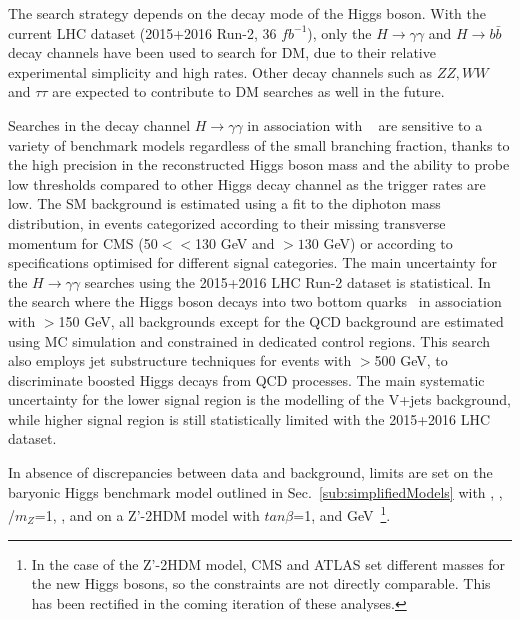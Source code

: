 The search strategy depends on the decay mode of the Higgs boson. 
With the current LHC dataset (2015+2016 Run-2, 36 $fb^{-1}$), only the 
$H \rightarrow \gamma\gamma$ and $H \rightarrow b\bar{b}$ decay channels 
have been used to search for DM, due to their relative experimental simplicity
and high rates. Other decay channels such as $ZZ, WW$ and $\tau\tau$ are 
expected to contribute to DM searches as well in the future. 

Searches in the decay channel 
$H \rightarrow \gamma\gamma$ in association with \MET~\cite{CMS-PAS-EXO-16-054,Aaboud:2017uak}
are sensitive to a variety of benchmark models regardless of the small branching fraction, thanks to the 
high precision in the reconstructed Higgs boson mass and the ability to probe low \MET 
thresholds compared to other Higgs decay channel as the trigger rates are low. 
The SM background is estimated using a fit to the diphoton mass distribution, in events categorized
according to their missing transverse momentum for CMS (50$<$\MET$<$130 GeV and \MET$>130$ GeV)
or according to specifications optimised for different signal categories.%
The main uncertainty for the $H \rightarrow \gamma\gamma$ searches using the 2015+2016
LHC Run-2 dataset is statistical. 
In the search where the Higgs boson decays into two bottom quarks~\cite{Aaboud:2017yqz}
in association with \MET$>$150 GeV, 
all backgrounds except for the QCD background are estimated using MC simulation
and constrained in dedicated control regions. This search also employs jet substructure
techniques for events with \MET$>$500 GeV,
to discriminate boosted Higgs decays from QCD processes. 
The main systematic uncertainty for the lower \MET signal region is the modelling 
of the V+jets background, while higher \MET signal region is still statistically limited
with the 2015+2016 LHC dataset.

In absence of discrepancies between data and background,
limits are set on the baryonic Higgs benchmark model outlined in
Sec.~\ref{sub:simplifiedModels} with 
, , \ghZprimeZprime/$m_{Z}$=1, , 
and on a Z'-2HDM model with $tan\beta$=1,  and  GeV~\footnote{ 
In the case of the Z'-2HDM model, CMS and ATLAS set different masses for the 
new Higgs bosons, 
so the constraints are not directly comparable. 
This has been rectified in the coming iteration of these analyses.}. 

